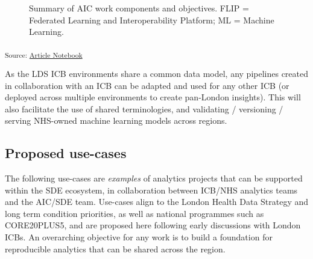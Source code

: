 \documentclass[
  letterpaper,
  DIV=11,
  numbers=noendperiod]{scrartcl}
\begin{document}
\begin{figure}


\caption{\label{fig-aic-objectives}Summary of AIC work components and
objectives. FLIP = Federated Learning and Interoperability Platform; ML
= Machine Learning.}

\end{figure}%

\textsubscript{Source:
\href{https://d3london.github.io/sde_aic_docs/index.qmd.html}{Article
Notebook}}

As the LDS ICB environments share a common data model, any pipelines
created in collaboration with an ICB can be adapted and used for any
other ICB (or deployed across multiple environments to create pan-London
insights). This will also facilitate the use of shared terminologies,
and validating / versioning / serving NHS-owned machine learning models
across regions.

\subsection{Proposed use-cases}\label{proposed-use-cases}

The following use-cases are \emph{examples} of analytics projects that
can be supported within the SDE ecosystem, in collaboration between
ICB/NHS analytics teams and the AIC/SDE team. Use-cases align to the
London Health Data Strategy and long term condition priorities, as well
as national programmes such as CORE20PLUS5, and are proposed here
following early discussions with London ICBs. An overarching objective
for any work is to build a foundation for reproducible analytics that
can be shared across the region.
\end{document}
